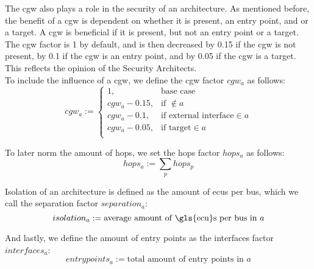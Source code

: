 \hfill \break

The \gls{cgw} also plays a role in the security of an architecture.
As mentioned before, the benefit of a \gls{cgw} is dependent on whether it is present, an entry point, and or a target.
A \gls{cgw} is beneficial if it is present, but not an entry point or a target.
The \gls{cgw} factor is 1 by default, and is then decreased by 0.15 if the \gls{cgw} is not present,
by 0.1 if the \gls{cgw} is an entry point, and by 0.05 if the \gls{cgw} is a target.
This reflects the opinion of the Security Architects.\\
To include the influence of a \gls{cgw}, we define the \gls{cgw} factor $cgw_{a}$ as follows:\\
\begin{equation}
    cgw_{a} := 
    \begin{cases}
    1,&\text{base case}\\
    cgw_{a} - 0.15,&\text{if } \not\in a\\
    cgw_{a} - 0.1,&\text{if external interface} \in a\\
    cgw_{a} - 0.05,&\text{if target} \in a\\
    \end{cases} \label{eq:cgw}
\end{equation}

\hfill \break

To later norm the amount of hops, we set the hops factor $hops_{a}$ as follows:\\
\begin{equation}
    hops_{a} := \sum_{p} hops_{p} \label{eq:hops}
\end{equation}

\hfill \break

Isolation of an architecture is defined as the amount of \gls{ecu}s per bus, which we call the separation factor $separation_{a}$:\\
\begin{equation}
    isolation_{a} := \text{average amount of \gls{ecu}s per bus in } a \label{eq:isolation}
\end{equation}

\hfill \break

And lastly, we define the amount of entry points as the interfaces factor $interfaces_{a}$:\\
\begin{equation}
    entrypoints_{a} := \text{total amount of entry points in } a \label{eq:interfaces}
\end{equation}

